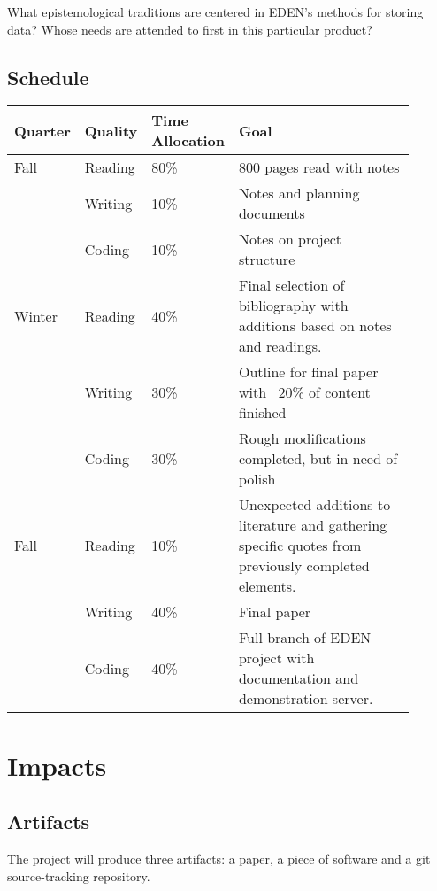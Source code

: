 \documentclass[a4paper,man,natbib]{apa6}
\begin{document}
   What epistemological traditions are centered in EDEN's methods for storing data? Whose needs are attended to first in this particular product?
   \subsection*{Schedule}
   \begin{center}
   \begin{tabular}{|l|p{0.1\linewidth}|p{0.1\linewidth}|p{0.7\linewidth}|}
   \hline
   Quarter & Quality & Time Allocation & Goal                         \\ \hline
   Fall    & Reading & 80\%            & 800 pages read with notes    \\ \cline{2-4} 
           & Writing & 10\%            & Notes and planning documents \\ \cline{2-4} 
           & Coding  & 10\%            & Notes on project structure   \\ \hline 
   Winter  & Reading & 40\%            & Final selection of bibliography with additions based on notes and readings.   \\ \cline{2-4} 
           & Writing & 30\%            & Outline for final paper with ~20\% of content finished \\ \cline{2-4} 
           & Coding  & 30\%            & Rough modifications completed, but in need of polish  \\ \hline
   Fall    & Reading & 10\%            & Unexpected additions to literature and gathering specific quotes from previously completed elements.   \\ \cline{2-4} 
           & Writing & 40\%            & Final paper \\ \cline{2-4}
           & Coding  & 40\%            & Full branch of EDEN project with documentation and demonstration server. \\ \hline
   \end{tabular}
   \end{center}
   \section*{Impacts}
   \subsection*{Artifacts}
   The project will produce three artifacts: a paper, a piece of software and a git source-tracking repository.
\end{document}
